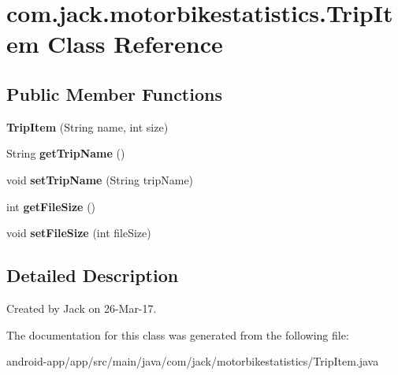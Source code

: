 \hypertarget{classcom_1_1jack_1_1motorbikestatistics_1_1_trip_item}{}\section{com.\+jack.\+motorbikestatistics.\+Trip\+Item Class Reference}
\label{classcom_1_1jack_1_1motorbikestatistics_1_1_trip_item}
\subsection*{Public Member Functions}
\begin{DoxyCompactItemize}
\item 
\mbox{\label{classcom_1_1jack_1_1motorbikestatistics_1_1_trip_item_a17a6df81af0062b7bf03babb4c7433b0}} 
{\bfseries Trip\+Item} (String name, int size)
\item 
\mbox{\label{classcom_1_1jack_1_1motorbikestatistics_1_1_trip_item_a0416f27a3fcd2344fca453f7a2a6b4d0}} 
String {\bfseries get\+Trip\+Name} ()
\item 
\mbox{\label{classcom_1_1jack_1_1motorbikestatistics_1_1_trip_item_a359fbbbde7fde3af75379054c87cfb2d}} 
void {\bfseries set\+Trip\+Name} (String trip\+Name)
\item 
\mbox{\label{classcom_1_1jack_1_1motorbikestatistics_1_1_trip_item_aec0e07444e68e4492daa734bf3d6e24a}} 
int {\bfseries get\+File\+Size} ()
\item 
\mbox{\label{classcom_1_1jack_1_1motorbikestatistics_1_1_trip_item_a133ad3b07e6c5d57203ffdc81f6a51fc}} 
void {\bfseries set\+File\+Size} (int file\+Size)
\end{DoxyCompactItemize}


\subsection{Detailed Description}
Created by Jack on 26-\/\+Mar-\/17. 

The documentation for this class was generated from the following file\+:\begin{DoxyCompactItemize}
\item 
android-\/app/app/src/main/java/com/jack/motorbikestatistics/Trip\+Item.\+java\end{DoxyCompactItemize}
